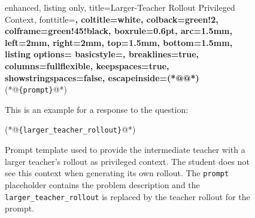 \begin{figure}[H]
    \centering
\begin{tcblisting}{
    enhanced,
    listing only,
    title={Larger-Teacher Rollout Privileged Context},
    fonttitle=\bfseries,
    coltitle=white,
    colback=green!2,
    colframe=green!45!black,
    boxrule=0.6pt,
    arc=1.5mm,
    left=2mm,
    right=2mm,
    top=1.5mm,
    bottom=1.5mm,
    listing options={
        basicstyle=\ttfamily\scriptsize,
        breaklines=true,
        columns=fullflexible,
        keepspaces=true,
        showstringspaces=false,
        escapeinside={(*@}{@*)}
    }
}
(*@\textcolor{blue!70!black}{\texttt{\{prompt\}}}@*)

This is an example for a response to the question:

(*@\textcolor{blue!70!black}{\texttt{\{larger\_teacher\_rollout\}}}@*)
\end{tcblisting}
    \caption{Prompt template used to provide the intermediate teacher with a larger teacher's rollout as privileged context. The student does not see this context when generating its own rollout. The \texttt{prompt} placeholder contains the problem description and the \texttt{larger\_teacher\_rollout} is replaced by the teacher rollout for the prompt.}
    \label{fig: pc_rollout_example}
\end{figure}
